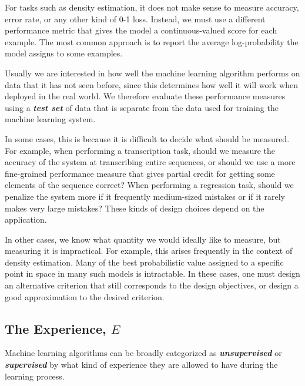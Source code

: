 \documentclass{report}
\begin{document}
\noindent For tasks such as density estimation, it does not make sense to measure accuracy, error rate, or any other kind of 0-1 loss. Instead, we must use a different performance metric that gives the model a continuous-valued score for each example. The most common approach is to report the average log-probability the model assigns to some examples.\newline

\noindent Usually we are interested in how well the machine learning algorithm performs on data that it has not seen before, since this determines how well it will work when deployed in the real world. We therefore evaluate these performance measures using a \textbf{\textit{test set}} of data that is separate from the data used for training the machine learning system.\newline

\noindent In some cases, this is because it is difficult to decide what should be measured. For example, when performing a transcription task, should we measure the accuracy of the system at transcribing entire sequences, or should we use a more fine-grained performance measure that gives partial credit for getting some elements of the sequence correct? When performing a regression task, should we penalize the system more if it frequently medium-sized mistakes or if it rarely makes very large mistakes? These kinds of design choices depend on the application.\newline

\noindent In other cases, we know what quantity we would ideally like to measure, but measuring it is impractical. For example, this arises frequently in the context of density estimation. Many of the best probabilistic value assigned to a specific point in space in many such models is intractable. In these cases, one must design an alternative criterion that still corresponds to the design objectives, or design a good approximation to the desired criterion.\newline

\subsection{The Experience, $E$}
\noindent Machine learning algorithms can be broadly categorized as \textbf{\textit{unsupervised}} or \textbf{\textit{supervised}} by what kind of experience they are allowed to have during the learning process.\newline
\end{document}
